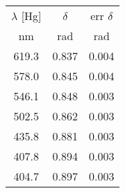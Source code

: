 \begin{table}[H]
    \begin{center}
    \begin{tabular}{|c|c c|}
    \hline
        $\lambda$ [Hg]	&	$\delta$	&		err $\delta$ \\
        nm	&	rad	&		rad	\\
    \hline
        619.3	&	0.837	&		0.004	\\ 
        578.0	&	0.845	&		0.004	\\
        546.1	&	0.848	&		0.003	\\
        502.5	&	0.862	&		0.003	\\
        435.8	&	0.881	&		0.003	\\
        407.8	&	0.894	&		0.003	\\
        404.7	&	0.897	&		0.003	\\
    \hline
    \end{tabular}
    \end{center}
    \label{O3_P2_1}
\end{table}

